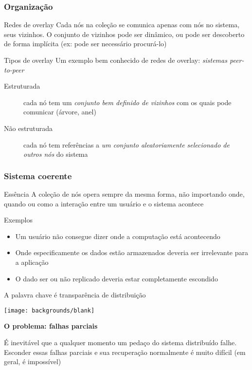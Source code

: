 \documentclass[Ligatures=TeX,table,brazil,svgnames,usetotalslideindicator,compress,10pt]{beamer}
\newcommand{\setintersectionbg}{
    \setbeamertemplate{background}
     {\texttt{[image: backgrounds/blank]}}
}
\begin{document}
\begin{frame}
  \frametitle{Organização}
  \begin{block}{Redes de overlay}
    Cada nós na coleção se comunica apenas com nós no sistema, seus \alert{vizinhos}. O conjunto de vizinhos pode ser dinâmico, ou pode ser descoberto de forma implícita (ex: pode ser necessário procurá-lo)
  \end{block}

  \begin{block}{Tipos de overlay}
    Um exemplo bem conhecido de redes de overlay: \emph{sistemas peer-to-peer}
    \begin{description}
    \item[Estruturada] cada nó tem um \emph{conjunto bem definido de vizinhos} com os quais pode comunicar (árvore, anel)
    \item[Não estruturada] cada nó tem referências a \emph{um conjunto aleatoriamente selecionado de outros nós} do sistema
    \end{description}
  \end{block}
\end{frame}

\begin{frame}
  \frametitle{Sistema coerente}
  \begin{block}{Essência}
    A coleção de nós opera sempre da mesma forma, não importando onde, quando ou como a interação entre um usuário e o sistema acontece
  \end{block}

  \begin{exampleblock}{Exemplos}
    \begin{itemize}
    \item Um usuário não consegue dizer onde a computação está acontecendo
    \item Onde especificamente os dados estão armazenados deveria ser irrelevante para a aplicação
    \item O dado ser ou não replicado deveria estar completamente escondido
    \end{itemize}
  \end{exampleblock}

  A palavra chave é \alert{transparência de distribuição}
\end{frame}

\setintersectionbg

\begin{frame}[standout]
  \textbf{O problema: falhas parciais}

  É inevitável que a qualquer momento um \alert{pedaço} do sistema
  distribuído falhe. Esconder essas falhas parciais e sua recuperação
  normalmente é muito difícil (em geral, é impossível)
\end{frame}
\end{document}
